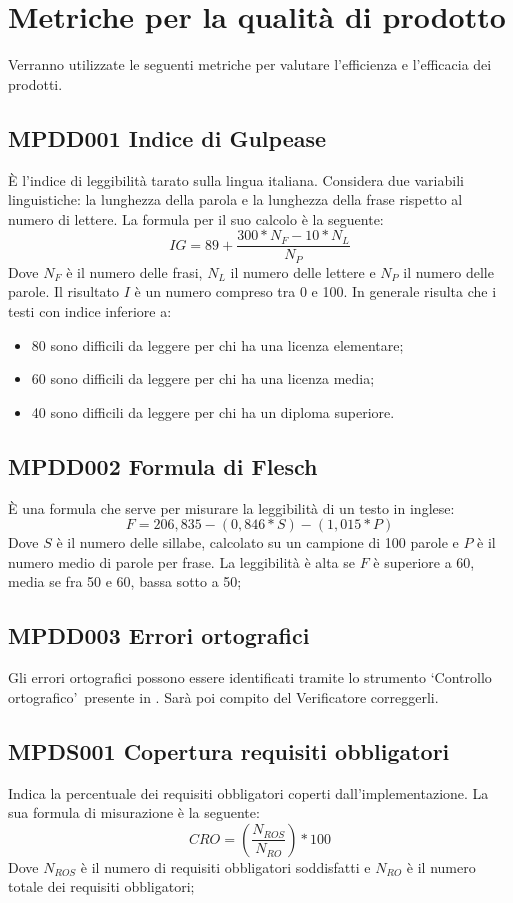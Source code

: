 \documentclass[NormeDiProgetto.tex]{subfiles}
\begin{document}
\section{Metriche per la qualità di prodotto}
Verranno utilizzate le seguenti metriche per valutare l'efficienza e l'efficacia dei prodotti.
\subsection{MPDD001 Indice di Gulpease} \`{E} l'indice di leggibilità tarato sulla lingua italiana. Considera due variabili linguistiche: la lunghezza della parola e la lunghezza della frase rispetto al numero di lettere. La formula per il suo calcolo è la seguente:
\[IG=89+\dfrac{300*N_F-10*N_L}{N_P}\] Dove $ N_F $ è il numero delle frasi, $ N_L $ il numero delle lettere e $ N_P $ il numero delle parole. Il risultato $I$ è un numero compreso tra 0 e 100. In generale risulta che i testi con indice inferiore a:
\begin{itemize}
	\item 80 sono difficili da leggere per chi ha una licenza elementare;
	\item 60 sono difficili da leggere per chi ha una licenza media;
	\item 40 sono difficili da leggere per chi ha un diploma superiore.
\end{itemize}	
\subsection {MPDD002 Formula di Flesch} \`{E} una formula che serve per misurare la leggibilità di un testo in inglese:
\[F=206,835-(0,846*S)-(1,015*P)\] Dove $ S $ è il numero delle sillabe, calcolato su un campione di 100 parole e $ P $ è il numero medio di parole per frase.
La leggibilità è alta se $F$ è superiore a 60, media se fra 50 e 60, bassa sotto a 50;
\subsection{MPDD003 Errori ortografici} Gli errori ortografici possono essere identificati tramite lo strumento \textquoteleft Controllo ortografico\textquoteright\ presente in . Sarà poi compito del Verificatore correggerli.  	


\subsection{MPDS001 Copertura requisiti obbligatori} Indica la percentuale dei requisiti obbligatori coperti dall'implementazione. La sua formula di misurazione è la seguente: \[CRO=(\frac{N_{ROS}}{N_{RO}})*100\] Dove $ N_{ROS} $ è il numero di requisiti obbligatori soddisfatti e $ N_{RO} $ è il numero totale dei requisiti obbligatori;
\end{document}
